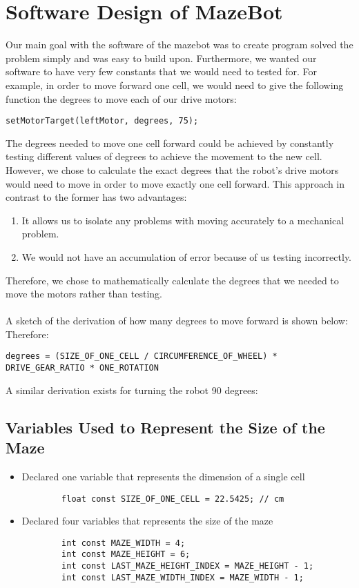 \documentclass[11pt]{article}
\begin{document}
\section{Software Design of MazeBot}
Our main goal with the software of the mazebot was to create program solved the problem simply and was easy to build upon. Furthermore, we wanted our software to have very few constants that we would need to tested for. For example, in order to move forward one cell, we would need to give the following function the degrees to move each of our drive motors:
\begin{verbatim}
setMotorTarget(leftMotor, degrees, 75);
\end{verbatim}
The degrees needed to move one cell forward could be achieved by constantly testing different values of degrees to achieve the movement to the new cell. However, we chose to calculate the exact degrees that the robot's drive motors would need to move in order to move exactly one cell forward. This approach in contrast to the former has two advantages: 
\begin{enumerate}
\item It allows us to isolate any problems with moving accurately to a mechanical problem.
\item We would not have an accumulation of error because of us testing incorrectly.
\end{enumerate}
Therefore, we chose to mathematically calculate the degrees that we needed to move the motors rather than testing.\\\\
A sketch of the derivation of how many degrees to move forward is shown below: %
\\
Therefore:
\begin{verbatim}
degrees = (SIZE_OF_ONE_CELL / CIRCUMFERENCE_OF_WHEEL) * DRIVE_GEAR_RATIO * ONE_ROTATION
\end{verbatim}
A similar derivation exists for turning the robot 90 degrees: %








\subsection{Variables Used to Represent the Size of the Maze}
\begin{itemize}
\item Declared one variable that represents the dimension of a single cell
	\begin{verbatim}
		float const SIZE_OF_ONE_CELL = 22.5425; // cm 	
	\end{verbatim} 
\item Declared four variables that represents the size of the maze
	\begin{verbatim}
		int const MAZE_WIDTH = 4;
		int const MAZE_HEIGHT = 6;
		int const LAST_MAZE_HEIGHT_INDEX = MAZE_HEIGHT - 1;
		int const LAST_MAZE_WIDTH_INDEX = MAZE_WIDTH - 1;
	\end{verbatim} 
\end{itemize}
\end{document}
